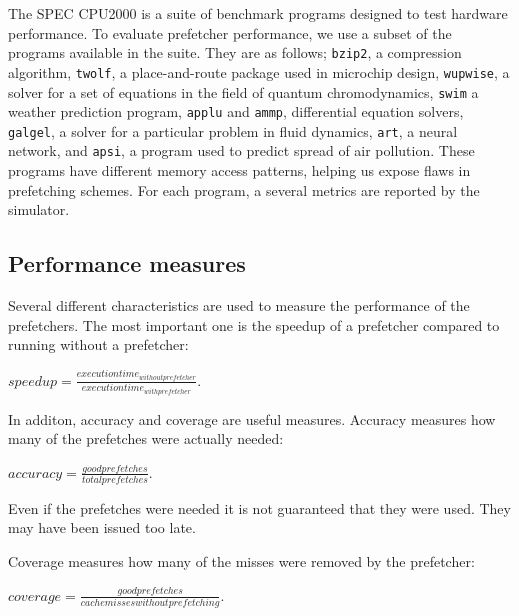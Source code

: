 The SPEC CPU2000\cite{bib:cpu2000} is a suite of benchmark programs designed to test hardware performance.
To evaluate prefetcher performance, we use a subset of the programs available in the suite.
They are as follows; \texttt{bzip2}, a compression algorithm, \texttt{twolf},
a place-and-route package used in microchip design, \texttt{wupwise}, a solver for a set of
equations in the field of quantum chromodynamics, \texttt{swim} a weather prediction program,
\texttt{applu} and \texttt{ammp}, differential equation solvers, \texttt{galgel}, a solver for a
particular problem in fluid dynamics, \texttt{art}, a neural network, and \texttt{apsi}, a program used to predict spread of air pollution.
These programs have different memory access patterns, helping us expose flaws in prefetching schemes.
For each program, a several metrics are reported by the simulator.

\subsection{Performance measures}
Several different characteristics are used to measure the performance
of the prefetchers. The most important one is the speedup of a
prefetcher compared to running without a prefetcher:

$speedup = \frac{execution time_{without prefetcher}}{execution time_{with prefetcher}}$.

In additon, accuracy and coverage are useful measures. Accuracy measures
how many of the prefetches were actually needed:

$accuracy = \frac{good prefetches}{total prefetches}$.

Even if the prefetches were needed it is not guaranteed that they
were used. They may have been issued too late.

Coverage measures how many of the misses were removed by the
prefetcher:

$coverage = \frac{good prefetches}{cache misses without prefetching}$.

\cite{bib:doc}
